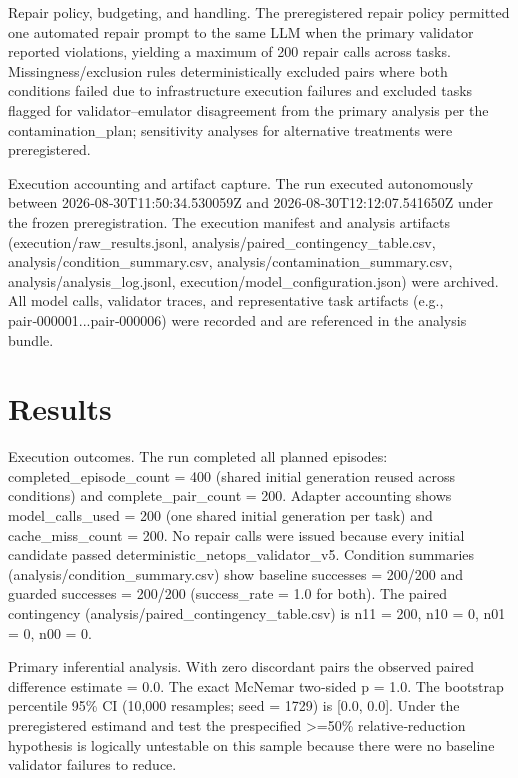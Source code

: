 \documentclass[conference]{IEEEtran}
\begin{document}
Repair policy, budgeting, and handling. The preregistered repair policy permitted one automated repair prompt to the same LLM when the primary validator reported violations, yielding a maximum of 200 repair calls across tasks. Missingness/exclusion rules deterministically excluded pairs where both conditions failed due to infrastructure execution failures and excluded tasks flagged for validator--emulator disagreement from the primary analysis per the contamination\_plan; sensitivity analyses for alternative treatments were preregistered.

Execution accounting and artifact capture. The run executed autonomously between 2026‑08‑30T11:50:34.530059Z and 2026‑08‑30T12:12:07.541650Z under the frozen preregistration. The execution manifest and analysis artifacts (execution/raw\_results.jsonl, analysis/paired\_contingency\_table.csv, analysis/condition\_summary.csv, analysis/contamination\_summary.csv, analysis/analysis\_log.jsonl, execution/model\_configuration.json) were archived. All model calls, validator traces, and representative task artifacts (e.g., pair‑000001...pair‑000006) were recorded and are referenced in the analysis bundle.

\section{Results}
Execution outcomes. The run completed all planned episodes: completed\_episode\_count = 400 (shared initial generation reused across conditions) and complete\_pair\_count = 200. Adapter accounting shows model\_calls\_used = 200 (one shared initial generation per task) and cache\_miss\_count = 200. No repair calls were issued because every initial candidate passed deterministic\_netops\_validator\_v5. Condition summaries (analysis/condition\_summary.csv) show baseline successes = 200/200 and guarded successes = 200/200 (success\_rate = 1.0 for both). The paired contingency (analysis/paired\_contingency\_table.csv) is n11 = 200, n10 = 0, n01 = 0, n00 = 0.

Primary inferential analysis. With zero discordant pairs the observed paired difference estimate = 0.0. The exact McNemar two‑sided p = 1.0. The bootstrap percentile 95\% CI (10,000 resamples; seed = 1729) is [0.0, 0.0]. Under the preregistered estimand and test the prespecified >=50\% relative‑reduction hypothesis is logically untestable on this sample because there were no baseline validator failures to reduce.
\end{document}
